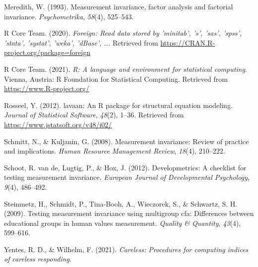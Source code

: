 \documentclass[
  english,
  man]{apa6}
\begin{document}
\leavevmode\hypertarget{ref-meredith1993measurement}{}%
Meredith, W. (1993). Measurement invariance, factor analysis and factorial invariance. \emph{Psychometrika}, \emph{58}(4), 525--543.

\leavevmode\hypertarget{ref-R-foreign}{}%
R Core Team. (2020). \emph{Foreign: Read data stored by 'minitab', 's', 'sas', 'spss', 'stata', 'systat', 'weka', 'dBase', ...} Retrieved from \url{https://CRAN.R-project.org/package=foreign}

\leavevmode\hypertarget{ref-R-base}{}%
R Core Team. (2021). \emph{R: A language and environment for statistical computing}. Vienna, Austria: R Foundation for Statistical Computing. Retrieved from \url{https://www.R-project.org/}

\leavevmode\hypertarget{ref-R-lavaan}{}%
Rosseel, Y. (2012). lavaan: An R package for structural equation modeling. \emph{Journal of Statistical Software}, \emph{48}(2), 1--36. Retrieved from \url{https://www.jstatsoft.org/v48/i02/}

\leavevmode\hypertarget{ref-schmitt2008measurement}{}%
Schmitt, N., \& Kuljanin, G. (2008). Measurement invariance: Review of practice and implications. \emph{Human Resource Management Review}, \emph{18}(4), 210--222.

\leavevmode\hypertarget{ref-vandevelopmetrics}{}%
Schoot, R. van de, Lugtig, P., \& Hox, J. (2012). Developmetrics: A checklist for testing measurement invariance. \emph{European Journal of Developmental Psychology}, \emph{9}(4), 486--492.

\leavevmode\hypertarget{ref-steinmetz2009testing}{}%
Steinmetz, H., Schmidt, P., Tina-Booh, A., Wieczorek, S., \& Schwartz, S. H. (2009). Testing measurement invariance using multigroup cfa: Differences between educational groups in human values measurement. \emph{Quality \& Quantity}, \emph{43}(4), 599--616.

\leavevmode\hypertarget{ref-R-careless}{}%
Yentes, R. D., \& Wilhelm, F. (2021). \emph{Careless: Procedures for computing indices of careless responding}.

\endgroup
\end{document}

